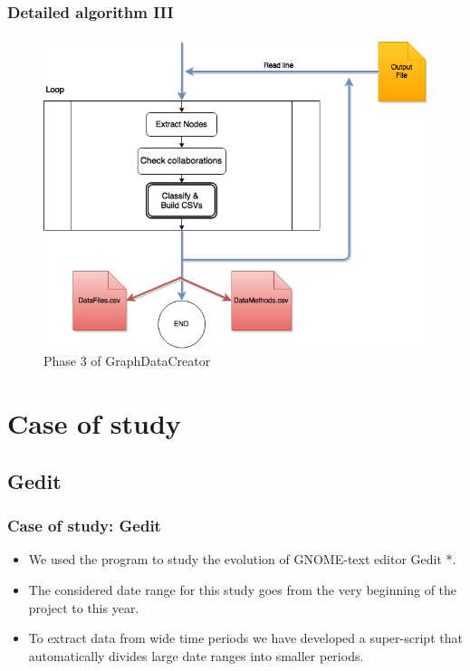 \documentclass{beamer}
\begin{document}

\begin{frame}
\frametitle{Detailed algorithm III}
\begin{figure}
\includegraphics[scale=0.35]{GDCphase3.png} 
\caption{Phase 3 of GraphDataCreator}
\label{fig:phase3}
\end{figure}
\end{frame}

\section{Case of study}
\subsection{Gedit}
\begin{frame}
\frametitle{Case of study: Gedit}
\begin{itemize}
\item We used the program to study the evolution of GNOME-text editor Gedit *.
\item The considered date range for this study goes from the very beginning of the project to this year.
\item To extract data from wide time periods we have developed a super-script that automatically divides large date ranges into smaller periods.
\end{itemize}
\end{frame}
\end{document}
